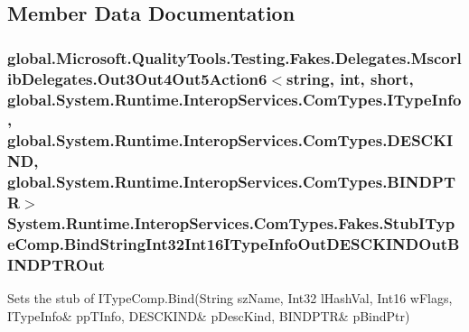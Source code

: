 \subsection{Member Data Documentation}
\hypertarget{class_system_1_1_runtime_1_1_interop_services_1_1_com_types_1_1_fakes_1_1_stub_i_type_comp_af68608d4ae61f7198360a560ca0f55eb}{
\subsubsection[{Bind\-String\-Int32\-Int16\-I\-Type\-Info\-Out\-D\-E\-S\-C\-K\-I\-N\-D\-Out\-B\-I\-N\-D\-P\-T\-R\-Out}]{\setlength{\rightskip}{0pt plus 5cm}global.\-Microsoft.\-Quality\-Tools.\-Testing.\-Fakes.\-Delegates.\-Mscorlib\-Delegates.\-Out3\-Out4\-Out5\-Action6$<$string, int, short, global.\-System.\-Runtime.\-Interop\-Services.\-Com\-Types.\-I\-Type\-Info, global.\-System.\-Runtime.\-Interop\-Services.\-Com\-Types.\-D\-E\-S\-C\-K\-I\-N\-D, global.\-System.\-Runtime.\-Interop\-Services.\-Com\-Types.\-B\-I\-N\-D\-P\-T\-R$>$ System.\-Runtime.\-Interop\-Services.\-Com\-Types.\-Fakes.\-Stub\-I\-Type\-Comp.\-Bind\-String\-Int32\-Int16\-I\-Type\-Info\-Out\-D\-E\-S\-C\-K\-I\-N\-D\-Out\-B\-I\-N\-D\-P\-T\-R\-Out}}\label{class_system_1_1_runtime_1_1_interop_services_1_1_com_types_1_1_fakes_1_1_stub_i_type_comp_af68608d4ae61f7198360a560ca0f55eb}


Sets the stub of I\-Type\-Comp.\-Bind(String sz\-Name, Int32 l\-Hash\-Val, Int16 w\-Flags, I\-Type\-Info\& pp\-T\-Info, D\-E\-S\-C\-K\-I\-N\-D\& p\-Desc\-Kind, B\-I\-N\-D\-P\-T\-R\& p\-Bind\-Ptr)

